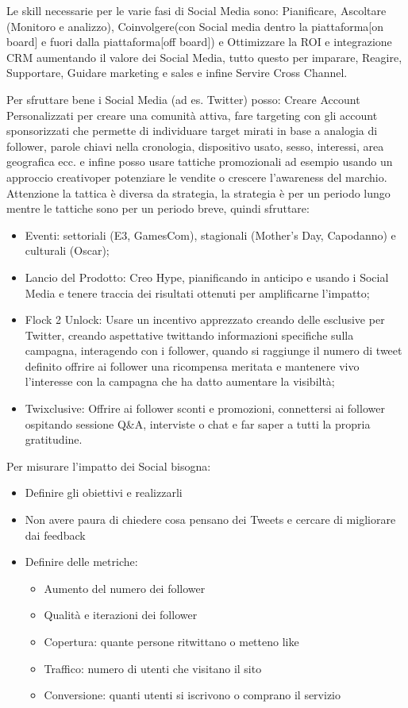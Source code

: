 \documentclass[11pt]{article}
\newenvironment{nosepitemize}{\begin{itemize}[noitemsep,topsep=0ex]}{\end{itemize}}
\begin{document}
Le skill necessarie per le varie fasi di Social Media sono: Pianificare, Ascoltare (Monitoro e analizzo), Coinvolgere(con Social media dentro la piattaforma[on board] e fuori dalla piattaforma[off board]) e Ottimizzare la ROI e integrazione CRM aumentando il valore dei Social Media, tutto questo per imparare, Reagire, Supportare, Guidare marketing e sales e infine Servire Cross Channel.

Per sfruttare bene i Social Media (ad es. Twitter) posso: Creare Account Personalizzati per creare una comunità attiva, fare targeting con gli account sponsorizzati che permette di individuare target mirati in base a analogia di follower, parole chiavi nella cronologia, dispositivo usato, sesso, interessi, area geografica ecc. e infine posso usare tattiche promozionali ad esempio usando un approccio creativoper potenziare le vendite o crescere l'awareness del marchio. Attenzione la tattica è diversa da strategia, la strategia è per un periodo lungo mentre le tattiche sono per un periodo breve, quindi sfruttare:
\begin{nosepitemize}
	\item Eventi: settoriali (E3, GamesCom), stagionali (Mother's Day, Capodanno) e culturali (Oscar);
	\item Lancio del Prodotto: Creo Hype, pianificando in anticipo e usando i Social Media e tenere traccia dei risultati ottenuti per amplificarne l'impatto;
	\item Flock  2 Unlock: Usare un incentivo apprezzato creando delle esclusive per Twitter, creando aspettative twittando informazioni specifiche sulla campagna, interagendo con i follower, quando si raggiunge il numero di tweet definito offrire ai follower una ricompensa meritata e mantenere vivo l'interesse con la campagna che ha datto aumentare la visibiltà;
	\item Twixclusive: Offrire ai follower sconti e promozioni, connettersi ai follower ospitando sessione Q\&A, interviste o chat e far saper a tutti la propria gratitudine.
\end{nosepitemize}
Per misurare l'impatto dei Social bisogna:
\begin{nosepitemize}
	\item Definire gli obiettivi e realizzarli
	\item Non avere paura di chiedere cosa pensano dei Tweets e cercare di migliorare dai feedback
	\item Definire delle metriche:
	\begin{nosepitemize}
		\item Aumento del numero dei follower
		\item Qualità e iterazioni dei follower
		\item Copertura: quante persone ritwittano o metteno like
		\item Traffico: numero di utenti che visitano il sito
		\item Conversione: quanti utenti si iscrivono o comprano il servizio
	\end{nosepitemize}
\end{nosepitemize}
\end{document}
